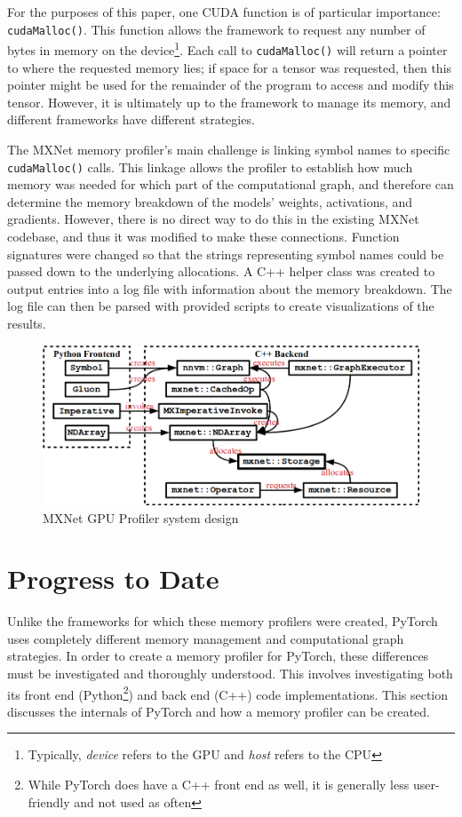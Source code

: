 \documentclass[12pt,letterpaper]{article}
\begin{document}
For the purposes of this paper, one CUDA function is of particular importance: \texttt{cudaMalloc()}. This function allows the framework to request any number of bytes in memory on the device\footnote{Typically, \textit{device} refers to the GPU and \textit{host} refers to the CPU}. Each call to \texttt{cudaMalloc()} will return a pointer to where the requested memory lies; if space for a tensor was requested, then this pointer might be used for the remainder of the program to access and modify this tensor. However, it is ultimately up to the framework to manage its memory, and different frameworks have different strategies. 
\par 

The MXNet memory profiler's main challenge is linking symbol names to specific \texttt{cudaMalloc()} calls. This linkage allows the profiler to establish how much memory was needed for which part of the computational graph, and therefore can determine the memory breakdown of the models' weights, activations, and gradients. However, there is no direct way to do this in the existing MXNet codebase, and thus it was modified to make these connections. Function signatures were changed so that the strings representing symbol names could be passed down to the underlying allocations. A C++ helper class was created to output entries into a log file with information about the memory breakdown. The log file can then be parsed with provided scripts to create visualizations of the results.
\par 

\begin{figure}[ht]
\centering
\includegraphics[width=.8\textwidth]{mxnet_profiler_design.png}
\captionsetup{width=0.7\linewidth}
\caption{MXNet GPU Profiler system design \cite{mxnet_profiler}}
\label{fig:mxnet_design}
\end{figure}

\section{Progress to Date}
\label{progress_to_date}
Unlike the frameworks for which these memory profilers were created, PyTorch uses completely different memory management and computational graph strategies. In order to create a memory profiler for PyTorch, these differences must be investigated and thoroughly understood. This involves investigating both its front end (Python\footnote{While PyTorch does have a C++ front end as well, it is generally less user-friendly and not used as often}) and back end (C++) code implementations. This section discusses the internals of PyTorch and how a memory profiler can be created.
\end{document}
